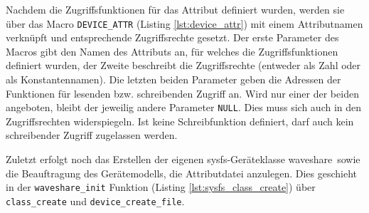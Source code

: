 Nachdem die Zugriffsfunktionen für das Attribut definiert wurden, werden sie über das Macro \texttt{DEVICE\_ATTR} (Listing \ref{lst:device_attr}) mit einem Attributnamen verknüpft und entsprechende Zugriffsrechte gesetzt. Der erste Parameter des Macros gibt den Namen des Attributs an, für welches die Zugriffsfunktionen definiert wurden, der Zweite beschreibt die Zugriffsrechte (entweder als Zahl oder als Konstantennamen). Die letzten beiden Parameter geben die Adressen der Funktionen für lesenden bzw. schreibenden Zugriff an. Wird nur einer der beiden angeboten, bleibt der jeweilig andere Parameter \texttt{NULL}. Dies muss sich auch in den Zugriffsrechten widerspiegeln. Ist keine Schreibfunktion definiert, darf auch kein schreibender Zugriff zugelassen werden. 




Zuletzt erfolgt noch das Erstellen der eigenen sysfs-Geräteklasse \glqq waveshare\grqq~sowie die Beauftragung des Gerätemodells, die Attributdatei anzulegen. Dies geschieht in der \texttt{waveshare_init} Funktion (Listing  \ref{lst:sysfs_class_create}) über \texttt{class\_create} und \texttt{device\_create\_file}.



